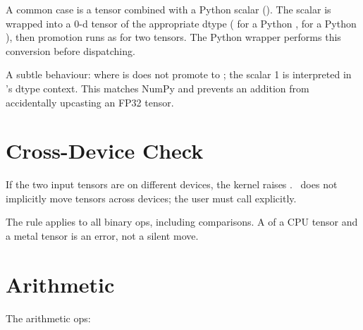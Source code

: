 A common case is a tensor combined with a Python scalar
(). The scalar is wrapped into a 0-d tensor of
the appropriate dtype ( for a Python ,
 for a Python ), then promotion runs as for
two tensors. The Python wrapper performs this conversion before
dispatching.

A subtle behaviour:  where  is 
does not promote to ; the scalar 1 is interpreted in
's dtype context. This matches NumPy and prevents an
 addition from accidentally upcasting an FP32 tensor.

\section{Cross-Device Check}
\label{sec:binary_functions:device_check}

If the two input tensors are on different devices, the kernel
raises . \Lucid\ does not implicitly move tensors across
devices; the user must call  explicitly.

The rule applies to all binary ops, including comparisons. A
 of a CPU tensor and a metal tensor is an
error, not a silent move.

\section{Arithmetic}
\label{sec:binary_functions:arithmetic}

The arithmetic ops:

